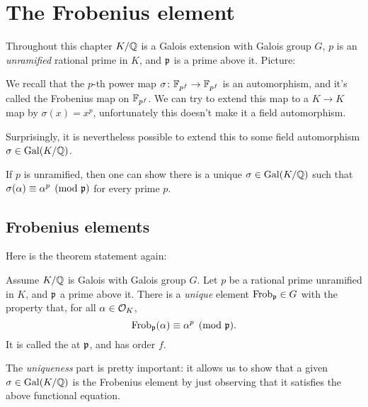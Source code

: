 \chapter{The Frobenius element}
\label{ch:frobenius-element}
Throughout this chapter $K/\mathbb Q$ is a Galois extension with Galois group $G$,
$p$ is an \emph{unramified} rational prime in $K$, and $\mathfrak p$ is a prime above it.
Picture:
\begin{center}
\end{center}

We recall that the $p$-th power map $\sigma \colon \mathbb F_{p^f} \to \mathbb F_{p^f}$ is an automorphism, and it's called the Frobenius map on $\mathbb F_{p^f}$.
We can try to extend this map to a $K \to K$ map by $\sigma(x) = x^p$, unfortunately this doesn't make it a field automorphism.

Surprisingly, it is nevertheless possible to extend this to some field automorphism $\sigma \in \operatorname{Gal}(K/\mathbb Q)$.

If $p$ is unramified, then one can show there
is a unique $\sigma \in \operatorname{Gal}(K/\mathbb Q)$ such that
$\sigma(\alpha) \equiv \alpha^p \pmod{\mathfrak p}$ for every prime $p$.

\section{Frobenius elements}

Here is the theorem statement again:
\begin{theorem}
	Assume $K/\mathbb Q$ is Galois with Galois group $G$.
	Let $p$ be a rational prime unramified in $K$, and $\mathfrak p$ a prime above it.
	There is a \emph{unique} element $\mathrm{Frob}_\mathfrak p \in G$
	with the property that, for all $\alpha \in \mathcal O_K$,
	\[ \mathrm{Frob}_\mathfrak p(\alpha) \equiv \alpha^{p} \pmod{\mathfrak p}. \]
	It is called the  at $\mathfrak p$, and has order $f$.
\end{theorem}
The \emph{uniqueness} part is pretty important:
it allows us to show that a given $\sigma \in \operatorname{Gal}(K/\mathbb Q)$
is the Frobenius element by just observing that it satisfies
the above functional equation.

